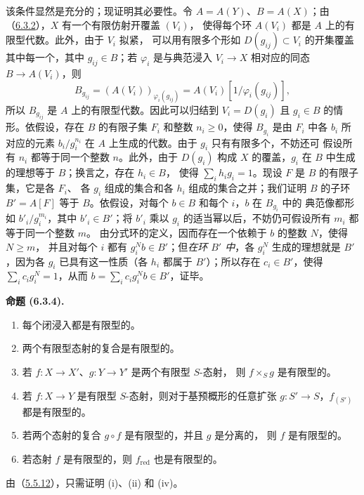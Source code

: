 \documentclass[UTF8,fontset=none,11pt,oneside,openany]{ctexbook}
\newenvironment{proposition}[1][]{%
  \par\medskip\noindent\textbf{命题 (#1).}\ %
}{\par}
\let\EGAOriginalLabel\label
\renewcommand{\label}[1]{\phantomsection\EGAOriginalLabel{#1}}
\begin{document}
该条件显然是充分的；现证明其必要性。令 $A=A(Y)$、$B=A(X)$；由
（\hyperref[I.6.3.2-fr]{6.3.2}），$X$ 有一个有限仿射开覆盖 $(V_i)$，
使得每个环 $A(V_i)$ 都是 $A$ 上的有限型代数。此外，由于 $V_i$ 拟紧，
可以用有限多个形如 $D(g_{ij})\subset V_i$ 的开集覆盖其中每一个，其中
$g_{ij}\in B$；若 $\varphi_i$ 是与典范浸入 $V_i\to X$ 相对应的同态
$B\to A(V_i)$，则
\[
  B_{g_{ij}}=(A(V_i))_{\varphi_i(g_{ij})}
  =A(V_i)[1/\varphi_i(g_{ij})],
\]
所以 $B_{g_{ij}}$ 是 $A$ 上的有限型代数。因此可以归结到
$V_i=D(g_i)$ 且 $g_i\in B$ 的情形。依假设，存在 $B$ 的有限子集 $F_i$
和整数 $n_i\geq 0$，使得 $B_{g_i}$ 是由 $F_i$ 中各 $b_i$ 所对应的元素
$b_i/g_i^{n_i}$ 在 $A$ 上生成的代数。由于 $g_i$ 只有有限多个，不妨还可
假设所有 $n_i$ 都等于同一个整数 $n$。此外，由于 $D(g_i)$ 构成 $X$
的覆盖，$g_i$ 在 $B$ 中生成的理想等于 $B$；换言之，存在 $h_i\in B$，
使得 $\sum_i h_i g_i=1$。现设 $F$ 是 $B$ 的有限子集，它是各 $F_i$、
各 $g_i$ 组成的集合和各 $h_i$ 组成的集合之并；我们证明 $B$ 的子环
$B'=A[F]$
等于 $B$。依假设，对每个 $b\in B$ 和每个 $i$，$b$ 在 $B_{g_i}$ 中的
典范像都形如 $b'_i/g_i^{m_i}$，其中 $b'_i\in B'$；将 $b'_i$ 乘以
$g_i$ 的适当幂以后，不妨仍可假设所有 $m_i$ 都等于同一个整数 $m$。
由分式环的定义，因而存在一个依赖于 $b$ 的整数 $N$，使得 $N\geq m$，
并且对每个 $i$ 都有 $g_i^N b\in B'$；但\emph{在环 $B'$ 中}，各
$g_i^N$ 生成的理想就是 $B'$，因为各 $g_i$ 已具有这一性质（各 $h_i$
都属于 $B'$）；所以存在 $c_i\in B'$，使得
$\sum_i c_i g_i^N=1$，从而 $b=\sum_i c_i g_i^N b\in B'$，证毕。

\begin{proposition}[6.3.4]
\label{I.6.3.4-fr}
\begin{enumerate}
  \item[(i)] 每个闭浸入都是有限型的。
  \item[(ii)] 两个有限型态射的复合是有限型的。
  \item[(iii)] 若 $f:X\to X'$、$g:Y\to Y'$ 是两个有限型 $S$-态射，
    则 $f\times_S g$ 是有限型的。
  \item[(iv)] 若 $f:X\to Y$ 是有限型 $S$-态射，则对于基预概形的任意扩张
    $g:S'\to S$，$f_{(S')}$ 都是有限型的。
  \item[(v)] 若两个态射的复合 $g\circ f$ 是有限型的，并且 $g$ 是分离的，
    则 $f$ 是有限型的。
  \item[(vi)] 若态射 $f$ 是有限型的，则 $f_{\mathrm{red}}$ 也是有限型的。
\end{enumerate}
\end{proposition}

由（\hyperref[I.5.5.12-fr]{5.5.12}），只需证明 (i)、(ii) 和 (iv)。
\end{document}
